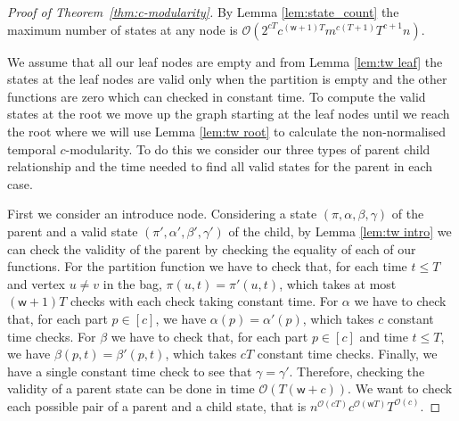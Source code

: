\documentclass[runningheads]{llncs}
\newcommand{\w}{\mathsf{w}}
\begin{document}
\begin{proof}[Proof of Theorem~\ref{thm:c-modularity}]
    By Lemma \ref{lem:state_count} the maximum number of states at any node is $\mathcal{O}(2^{cT}c^{(\w +1)T}m^{c(T+1)}T^{c+1}n)$.

    We assume that all our leaf nodes are empty and from Lemma \ref{lem:tw leaf} the states at the leaf nodes are valid only when the partition is empty and the other functions are zero which can checked in constant time. To compute the valid states at the root we move up the graph starting at the leaf nodes until we reach the root where we will use Lemma \ref{lem:tw root} to calculate the non-normalised temporal $c$-modularity. To do this we consider our three types of parent child relationship and the time needed to find all valid states for the parent in each case.

    First we consider an introduce node.
    Considering a state $(\pi,\alpha,\beta,\gamma)$ of the parent and a valid state $(\pi',\alpha',\beta',\gamma')$ of the child, by Lemma \ref{lem:tw intro} we can check the validity of the parent by checking the equality of each of our functions.
    For the partition function we have to check that, for each time $t\leq T$ and vertex $u\neq v$ in the bag, $\pi(u,t)=\pi'(u,t)$, which takes at most $(\w +1)T$ checks with each check taking constant time. 
    For $\alpha$ we have to check that, for each part $p\in[c]$, we have $\alpha(p)=\alpha'(p)$, which takes $c$ constant time checks.
    For $\beta$ we have to check that, for each part $p\in[c]$ and time $t\leq T$, we have $\beta(p,t)=\beta'(p,t)$, which takes $cT$ constant time checks.
    Finally, we have a single constant time check to see that $\gamma=\gamma'$.
    Therefore, checking the validity of a parent state can be done in time $\mathcal{O}(T(\w +c))$.
    We want to check each possible pair of a parent and a child state, that is $n^{\mathcal{O}(cT)}c^{\mathcal{O}(\w T)}T^{\mathcal{O}(c)}$.


\end{proof}
\end{document}
